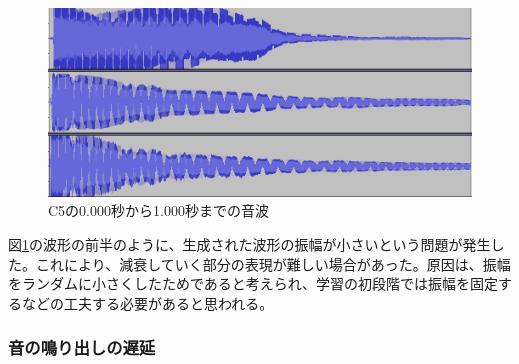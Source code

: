 \begin{figure}[t]
\begin{center}
\includegraphics[width=0.7\hsize]{figure/88_88/c5.png}
\caption{C5の0.000秒から1.000秒までの音波}
\label{fig:88_88_amp}
\end{center}
\end{figure}

図\ref{fig:88_88_amp}の波形の前半のように、生成された波形の振幅が小さいという問題が発生した。これにより、減衰していく部分の表現が難しい場合があった。原因は、振幅をランダムに小さくしたためであると考えられ、学習の初段階では振幅を固定するなどの工夫する必要があると思われる。
    
\subsubsection{音の鳴り出しの遅延}

